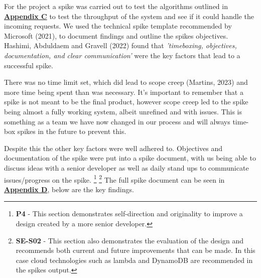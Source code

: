   For the project a spike was carried out to test the algorithms outlined in \hyperref[sec:AppendixC]{\textbf{Appendix C}} to test the 
  throughput of the system and see if it could handle the incoming requests. We used the technical spike template recommended by Microsoft (2021), to 
  document findings and outline the spikes objectives. Hashimi, Abduldaem and Gravell (2022) found that  \textit{'timeboxing, objectives,
  documentation, and clear communication'} were the key factors that lead to a successful spike.

  There was no time limit set, which did lead to scope creep (Martins, 2023) and more time being spent than was necessary. It's important to remember that a 
  spike is not meant to be the final product, however scope creep led to the spike being almost a fully working system, albeit unrefined and with issues. 
  This is something as a team we have now changed in our process and will always time-box spikes in the future to prevent this.

  Despite this the other key factors were well adhered to. Objectives and documentation of the spike were put into a spike document,
  with us being able to discuss ideas with a senior developer as well as daily stand ups to communicate issues/progress on the spike. 
  \footnote{\textbf{P4} - This section demonstrates self-direction and originality to improve a design created by a more senior developer.}
  \footnote{\textbf{SE-S02} - This section also demonstrates the evaluation of the design and recommends both current and future improvements that can be made.
  In this case cloud technologies such as lambda and DynamoDB are recommended in the spikes output.}
  The full spike document can be seen in \hyperref[sec:AppendixD]{\textbf{Appendix D}}, below are the key findings.


